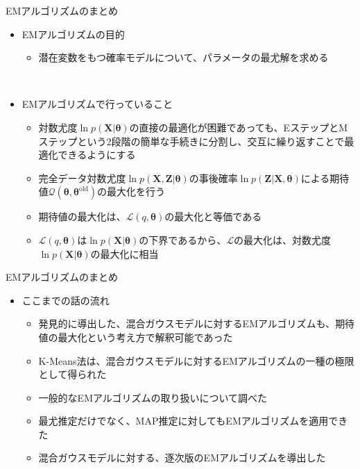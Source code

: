 \documentclass[dvipdfmx,notheorems,t]{beamer}
\begin{document}
\begin{frame}{EMアルゴリズムのまとめ}

\begin{itemize}
	\item EMアルゴリズムの目的
	\begin{itemize}
		\item 潜在変数をもつ確率モデルについて、パラメータの最尤解を求める
	\end{itemize} \
	
	\item EMアルゴリズムで行っていること
	\begin{itemize}
		\item 対数尤度$\ln p(\bm{X} | \bm{\theta})$の直接の最適化が困難であっても、EステップとMステップという2段階の簡単な手続きに分割し、交互に繰り返すことで最適化できるようにする
		\item 完全データ対数尤度$\ln p(\bm{X}, \bm{Z} | \bm{\theta})$の事後確率$\ln p(\bm{Z} | \bm{X}, \bm{\theta})$による期待値$\mathcal{Q}(\bm{\theta}, \bm{\theta}^\mathrm{old})$の最大化を行う
		\item 期待値の最大化は、$\mathcal{L}(q, \bm{\theta})$の最大化と等価である
		\item $\mathcal{L}(q, \bm{\theta})$は$\ln p(\bm{X} | \bm{\theta})$の下界であるから、$\mathcal{L}$の最大化は、対数尤度$\ln p(\bm{X} | \bm{\theta})$の最大化に相当
	\end{itemize}
\end{itemize}

\end{frame}

\begin{frame}{EMアルゴリズムのまとめ}

\begin{itemize}	
	\item ここまでの話の流れ
	\begin{itemize}
		\item 発見的に導出した、混合ガウスモデルに対するEMアルゴリズムも、\alert{期待値の最大化}という考え方で解釈可能であった
		\item K-Means法は、混合ガウスモデルに対するEMアルゴリズムの\alert{一種の極限として得られた}
		\item 一般的なEMアルゴリズムの取り扱いについて調べた
		\item 最尤推定だけでなく、\alert{MAP推定}に対してもEMアルゴリズムを適用できた
		\item 混合ガウスモデルに対する、逐次版のEMアルゴリズムを導出した
	\end{itemize}
\end{itemize}

\end{frame}
\end{document}
